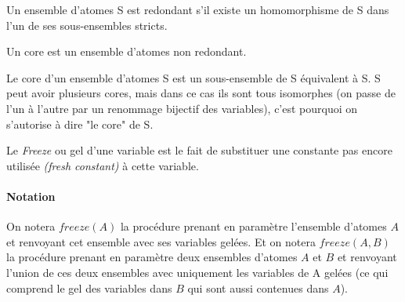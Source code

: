 

\begin{definition}
Un ensemble d'atomes S est redondant s'il existe un homomorphisme de S dans l'un de ses sous-ensembles stricts.
\end{definition}

\begin{definition}[Core]\label{def:Core}
Un core est un ensemble d'atomes non redondant.
\par Le core d'un ensemble d'atomes S est un sous-ensemble de S équivalent à S. S peut avoir plusieurs cores, mais dans ce cas ils sont tous isomorphes (on passe de l'un à l'autre par un renommage bijectif des variables), c'est pourquoi on s'autorise à dire "le core" de S.
\end{definition}


Le \textit{Freeze} ou gel d'une variable est le fait de substituer une constante pas encore utilisée \textit{(fresh constant)} à cette variable.

\paragraph{Notation}\label{def:freeze()} On notera $freeze(A)$ la procédure prenant en paramètre l'ensemble d'atomes $A$ et renvoyant cet ensemble avec ses variables gelées. Et on notera $freeze(A,B)$ la procédure prenant en paramètre deux ensembles d'atomes $A$ et $B$ et renvoyant l'union de ces deux ensembles avec uniquement les variables de A gelées (ce qui comprend le gel des variables dans $B$ qui sont aussi contenues dans $A$).

